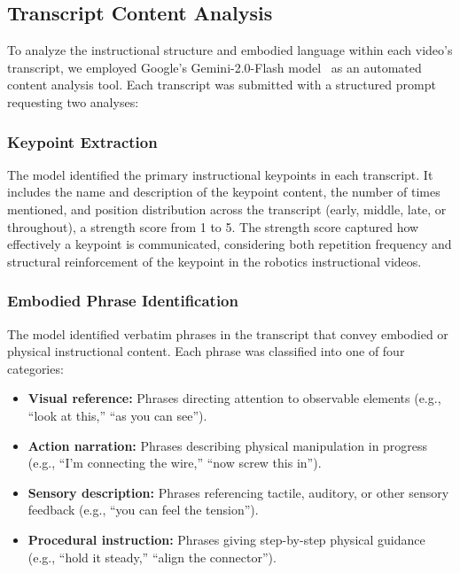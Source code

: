 \subsection{Transcript Content Analysis}

To analyze the instructional structure and embodied language within each video's transcript, we employed Google's Gemini-2.0-Flash model~\cite{gemini2024} as an automated content analysis tool. Each transcript was submitted with a structured prompt requesting two analyses:

\subsubsection{Keypoint Extraction}
The model identified the primary instructional keypoints in each transcript. It includes the name and description of the keypoint content, the number of times mentioned, and position distribution across the transcript (early, middle, late, or throughout), a strength score from 1 to 5. The strength score captured how effectively a keypoint is communicated, considering both repetition frequency and structural reinforcement of the keypoint in the robotics instructional videos.



\subsubsection{Embodied Phrase Identification}
The model identified verbatim phrases in the transcript that convey embodied or physical instructional content. Each phrase was classified into one of four categories:
\begin{itemize}
    \item \textbf{Visual reference:} Phrases directing attention to observable elements (e.g., ``look at this,'' ``as you can see'').
    \item \textbf{Action narration:} Phrases describing physical manipulation in progress (e.g., ``I'm connecting the wire,'' ``now screw this in'').
    \item \textbf{Sensory description:} Phrases referencing tactile, auditory, or other sensory feedback (e.g., ``you can feel the tension'').
    \item \textbf{Procedural instruction:} Phrases giving step-by-step physical guidance (e.g., ``hold it steady,'' ``align the connector'').
\end{itemize}

